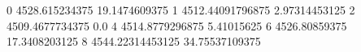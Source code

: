 0 4528.615234375 19.1474609375
1 4512.44091796875 2.97314453125
2 4509.4677734375 0.0
4 4514.8779296875 5.41015625
6 4526.80859375 17.3408203125
8 4544.22314453125 34.75537109375

